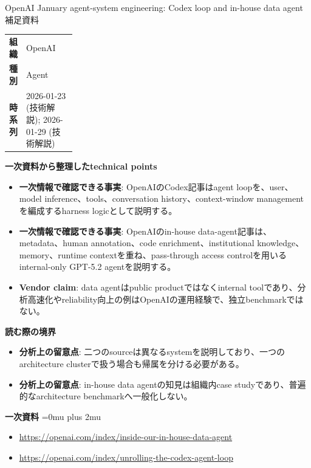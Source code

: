 \begin{technicalnote}{OpenAI January agent-system engineering: Codex loop and in-house data agent}{補足資料}
\begingroup
\begin{tabularx}{\linewidth}{@{}>{\bfseries}p{0.22\linewidth}X@{}}
組織 & OpenAI \\
種別 & Agent \\
時系列 & 2026-01-23 (技術解説); 2026-01-29 (技術解説) \\
\end{tabularx}
\smallskip
{\bfseries 一次資料から整理したtechnical points}
\begin{itemize}[leftmargin=1.5em,itemsep=0.35em]
\item \textbf{一次情報で確認できる事実}: OpenAIのCodex記事はagent loopを、user、model inference、tools、conversation history、context-window managementを編成するharness logicとして説明する。
\item \textbf{一次情報で確認できる事実}: OpenAIのin-house data-agent記事は、metadata、human annotation、code enrichment、institutional knowledge、memory、runtime contextを重ね、pass-through access controlを用いるinternal-only GPT-5.2 agentを説明する。
\item \textbf{Vendor claim}: data agentはpublic productではなくinternal toolであり、分析高速化やreliability向上の例はOpenAIの運用経験で、独立benchmarkではない。
\end{itemize}
\begin{minipage}{\linewidth}
{\bfseries 読む際の境界}
\begin{itemize}[leftmargin=1.5em,itemsep=0.35em]
\item \textbf{分析上の留意点}: 二つのsourceは異なるsystemを説明しており、一つのarchitecture clusterで扱う場合も帰属を分ける必要がある。
\item \textbf{分析上の留意点}: in-house data agentの知見は組織内case studyであり、普遍的なarchitecture benchmarkへ一般化しない。
\end{itemize}
\begin{samepage}
{\bfseries 一次資料}
\begingroup\sloppy
\Urlmuskip=0mu plus 2mu\relax
\begin{itemize}[leftmargin=1.5em,itemsep=0.25em]
\item {\scriptsize\url{https://openai.com/index/inside-our-in-house-data-agent}}
\item {\scriptsize\url{https://openai.com/index/unrolling-the-codex-agent-loop}}
\end{itemize}
\endgroup
\end{samepage}
\end{minipage}
\endgroup
\end{technicalnote}
\medskip

